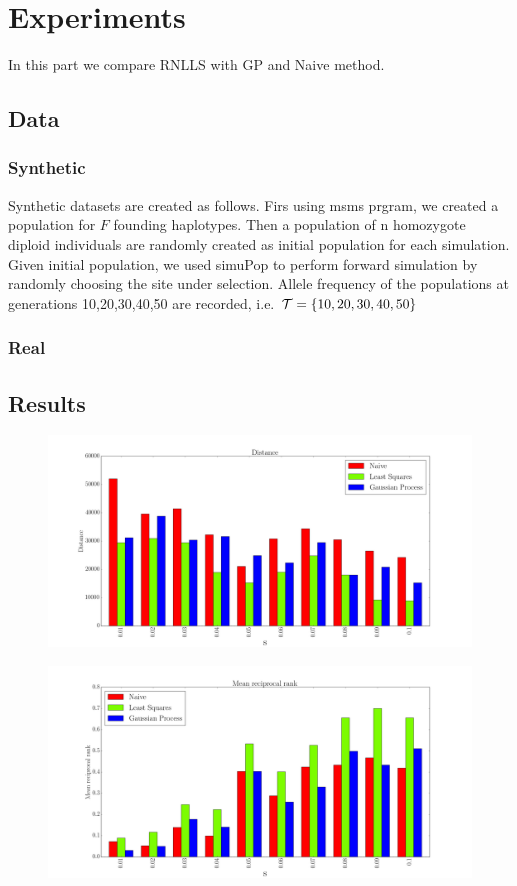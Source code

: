 \section{Experiments}
In this part we compare RNLLS with GP and Naive method. 
\subsection{Data}
\subsubsection{Synthetic}
Synthetic datasets are created as follows. Firs using msms prgram, we created a population for $F$ founding haplotypes. Then a population of n homozygote diploid individuals are randomly created as initial population for each simulation. Given initial population, we used simuPop to perform forward simulation by randomly choosing the site under selection. Allele frequency of the populations at generations 10,20,30,40,50 are recorded, i.e. ${\cal T}=\{10,20,30,40,50\}$
\subsubsection{Real}

\subsection{Results}
\begin{figure}
  \centering
    \includegraphics[width=\textwidth]{dist}
\end{figure}

\begin{figure}
  \centering
    \includegraphics[width=\textwidth]{mrr}
\end{figure}

